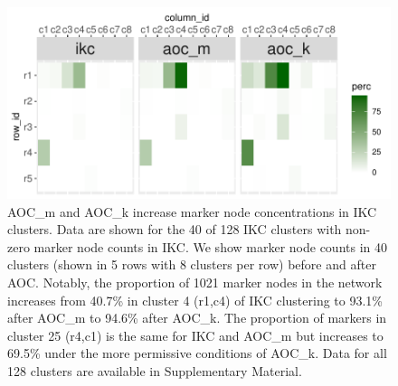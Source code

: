 \documentclass[12pt, oneside]{article}   	%
\begin{document}
\begin{figure}[H]
	\centering
	 \includegraphics[width=0.9\linewidth]{marker_comps_wide.pdf} 
\captionsetup{width=0.9\textwidth}
\caption{AOC\_m and AOC\_k increase marker node concentrations in IKC clusters. Data are shown for the 40 of 128 IKC clusters with non-zero marker node counts in IKC.  We show marker node counts in 40 clusters (shown in 5 rows with 8 clusters per row) before and after AOC.  Notably, the proportion of 1021 marker nodes in the network increases from 40.7\% in cluster 4 (r1,c4) of IKC clustering to 93.1\% after AOC\_m to 94.6\% after AOC\_k. The proportion of markers in cluster 25 (r4,c1) is the same for IKC and AOC\_m but increases to  69.5\% under the more permissive conditions of AOC\_k. Data for all 128 clusters are available in Supplementary Material.}
\label{fig:marker-node-concentration}
\end{figure}

\clearpage
\end{document}

